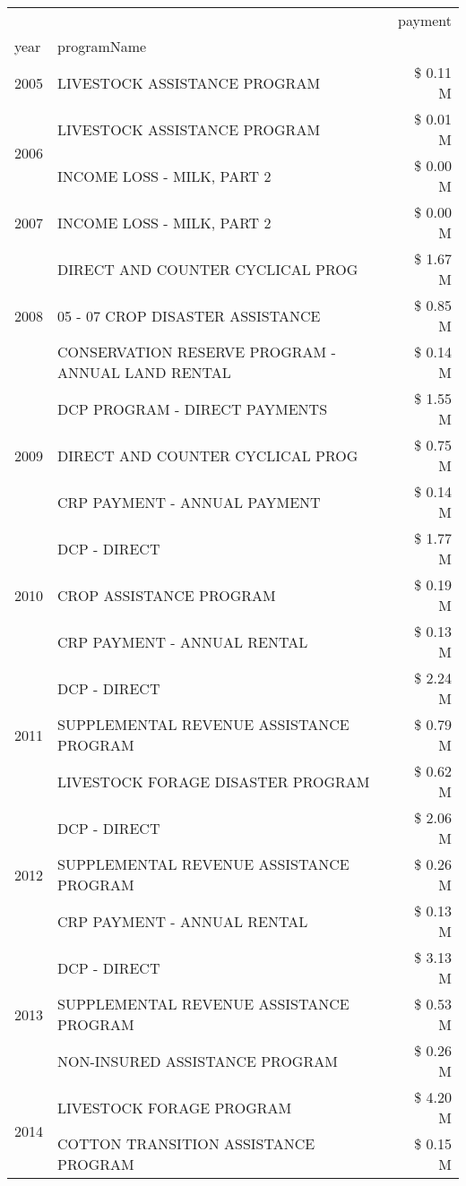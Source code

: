 \begin{tabular}{llr}
\toprule
 &  & payment \\
year & programName &  \\
\midrule
2005 & LIVESTOCK ASSISTANCE PROGRAM & \$ 0.11 M \\
\cline{1-3}
\multirow[t]{2}{*}{2006} & LIVESTOCK ASSISTANCE PROGRAM & \$ 0.01 M \\
 & INCOME LOSS - MILK, PART 2 & \$ 0.00 M \\
\cline{1-3}
2007 & INCOME LOSS - MILK, PART 2 & \$ 0.00 M \\
\cline{1-3}
\multirow[t]{3}{*}{2008} & DIRECT AND COUNTER CYCLICAL PROG & \$ 1.67 M \\
 & 05 - 07 CROP DISASTER ASSISTANCE & \$ 0.85 M \\
 & CONSERVATION RESERVE PROGRAM - ANNUAL LAND RENTAL & \$ 0.14 M \\
\cline{1-3}
\multirow[t]{3}{*}{2009} & DCP PROGRAM - DIRECT PAYMENTS & \$ 1.55 M \\
 & DIRECT AND COUNTER CYCLICAL PROG & \$ 0.75 M \\
 & CRP PAYMENT - ANNUAL PAYMENT & \$ 0.14 M \\
\cline{1-3}
\multirow[t]{3}{*}{2010} & DCP - DIRECT & \$ 1.77 M \\
 & CROP ASSISTANCE PROGRAM & \$ 0.19 M \\
 & CRP PAYMENT - ANNUAL RENTAL & \$ 0.13 M \\
\cline{1-3}
\multirow[t]{3}{*}{2011} & DCP - DIRECT & \$ 2.24 M \\
 & SUPPLEMENTAL REVENUE ASSISTANCE PROGRAM & \$ 0.79 M \\
 & LIVESTOCK FORAGE DISASTER PROGRAM & \$ 0.62 M \\
\cline{1-3}
\multirow[t]{3}{*}{2012} & DCP - DIRECT & \$ 2.06 M \\
 & SUPPLEMENTAL REVENUE ASSISTANCE PROGRAM & \$ 0.26 M \\
 & CRP PAYMENT - ANNUAL RENTAL & \$ 0.13 M \\
\cline{1-3}
\multirow[t]{3}{*}{2013} & DCP - DIRECT & \$ 3.13 M \\
 & SUPPLEMENTAL REVENUE ASSISTANCE PROGRAM & \$ 0.53 M \\
 & NON-INSURED ASSISTANCE PROGRAM & \$ 0.26 M \\
\cline{1-3}
\multirow[t]{3}{*}{2014} & LIVESTOCK FORAGE PROGRAM & \$ 4.20 M \\
 & COTTON TRANSITION ASSISTANCE PROGRAM & \$ 0.15 M \\

\end{tabular}
